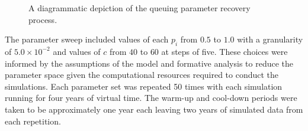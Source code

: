 \begin{figure}
{
    }
    \caption{%
        A diagrammatic depiction of the queuing parameter recovery process.
    }\label{fig:process}
\end{figure}

The parameter sweep included values of each \(p_i\) from \(0.5\) to \(1.0\) with
a granularity of \(5.0 \times 10^{-2}\) and values of \(c\) from \(40\) to
\(60\) at steps of five. These choices were informed by the assumptions of the
model and formative analysis to reduce the parameter space given the
computational resources required to conduct the simulations. Each parameter set
was repeated 50 times with each simulation running for four years of virtual
time. The warm-up and cool-down periods were taken to be approximately one year
each leaving two years of simulated data from each repetition.


